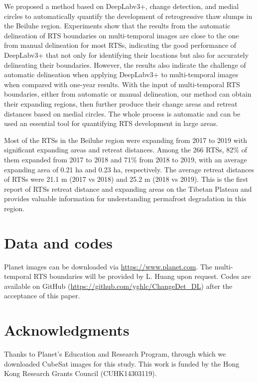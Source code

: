 \documentclass[authoryear,preprint,review,12pt]{elsarticle}
\begin{document}
We proposed a method based on DeepLabv3+, change detection, and medial circles to automatically quantify the development of retrogressive thaw slumps in the Beiluhe region. 
Experiments show that the results from the automatic delineation of RTS boundaries on multi-temporal images are close to the one from manual delineation for most RTSs, indicating the good performance of DeepLabv3+  that not only for identifying their locations but also for accurately delineating their boundaries. 
However, the results also indicate the challenge of automatic delineation when applying DeepLabv3+ to multi-temporal images when compared with one-year results. 
With the input of multi-temporal RTS boundaries, either from automatic or manual delineation, our method can obtain their expanding regions, then further produce their change areas and retreat distances based on medial circles. 
The whole process is automatic and can be used an essential tool for quantifying RTS development in large areas. 

Most of the RTSs in the Beiluhe region were expanding from 2017 to 2019 with significant expanding areas and retreat distances. 
Among the 266 RTSs, 82\% of them expanded from 2017 to 2018 and 71\% from 2018 to 2019, with an average expanding area of 0.21 ha and 0.23 ha, respectively.
The average retreat distances of RTSs were 21.1 m (2017 vs 2018) and 25.2 m (2018 vs 2019).
This is the first report of RTSs retreat distance and expanding areas on the Tibetan Plateau and provides valuable information for understanding permafrost degradation in this region. 


\section{Data and codes}
\label{sec_data_codes}

Planet images can be downloaded via \url{https://www.planet.com}. 
The multi-temporal RTS boundaries will be provided by L. Huang upon request. 
Codes are available on GitHub (\url{https://github.com/yghlc/ChangeDet_DL}) after the acceptance of this paper.

\section{Acknowledgments}
\label{sec_acknowledgments}


Thanks to Planet's Education and Research Program, through which we downloaded CubeSat images for this study. 
This work is funded by the Hong Kong Research Grants Council (CUHK14303119).
\end{document}
